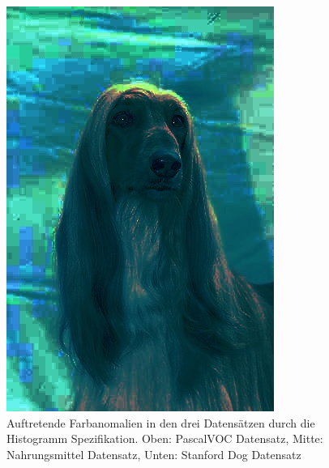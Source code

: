 \begin{appendices}
\begin{figure}[htb]
\begin{minipage}{0.19\textwidth}
\end{minipage}
\begin{minipage}{0.19\textwidth}
\includegraphics[width=\textwidth]{images/anomalien/HS/n02088094_1406.jpg}
\end{minipage}
\caption{Auftretende Farbanomalien in den drei Datensätzen durch die Histogramm Spezifikation. Oben: PascalVOC Datensatz, Mitte: Nahrungsmittel Datensatz, Unten: Stanford Dog Datensatz}
\label{img:anoHS}
\end{figure}


\end{appendices}